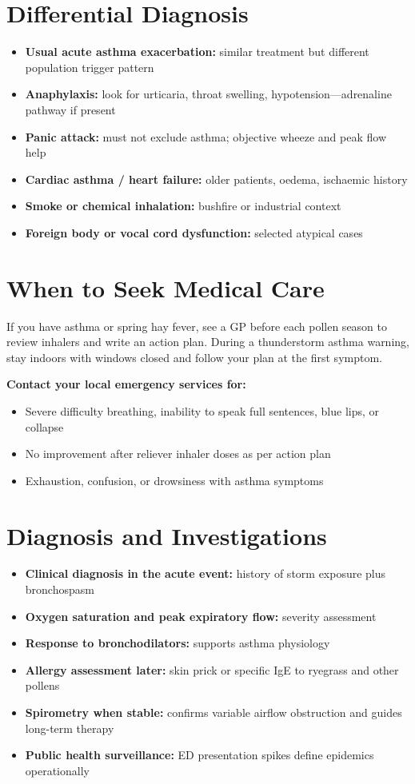 \section*{Differential Diagnosis}
\begin{itemize}
    \item \textbf{Usual acute asthma exacerbation:} similar treatment but different population trigger pattern
    \item \textbf{Anaphylaxis:} look for urticaria, throat swelling, hypotension---adrenaline pathway if present
    \item \textbf{Panic attack:} must not exclude asthma; objective wheeze and peak flow help
    \item \textbf{Cardiac asthma / heart failure:} older patients, oedema, ischaemic history
    \item \textbf{Smoke or chemical inhalation:} bushfire or industrial context
    \item \textbf{Foreign body or vocal cord dysfunction:} selected atypical cases
\end{itemize}

\section*{When to Seek Medical Care}
If you have asthma or spring hay fever, see a GP before each pollen season to review inhalers and write an action plan. During a thunderstorm asthma warning, stay indoors with windows closed and follow your plan at the first symptom.

\textbf{Contact your local emergency services for:}
\begin{itemize}
    \item Severe difficulty breathing, inability to speak full sentences, blue lips, or collapse
    \item No improvement after reliever inhaler doses as per action plan
    \item Exhaustion, confusion, or drowsiness with asthma symptoms
\end{itemize}

\section*{Diagnosis and Investigations}
\begin{itemize}
    \item \textbf{Clinical diagnosis in the acute event:} history of storm exposure plus bronchospasm
    \item \textbf{Oxygen saturation and peak expiratory flow:} severity assessment
    \item \textbf{Response to bronchodilators:} supports asthma physiology
    \item \textbf{Allergy assessment later:} skin prick or specific IgE to ryegrass and other pollens
    \item \textbf{Spirometry when stable:} confirms variable airflow obstruction and guides long-term therapy
    \item \textbf{Public health surveillance:} ED presentation spikes define epidemics operationally
\end{itemize}

